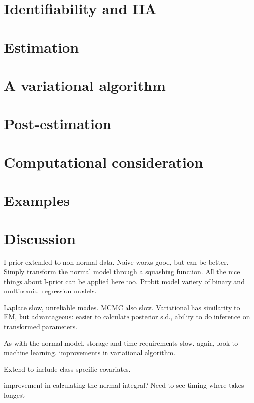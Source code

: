 \documentclass[a4paper,showframe,11pt]{report}
\begin{document}
\section{Identifiability and IIA}\label{sec:iia}
%

\section{Estimation}


\section{A variational algorithm}\label{sec:iprobitvar}


\section{Post-estimation}
%

\section{Computational consideration}
%

\section{Examples}

\section{Discussion}

I-prior extended to non-normal data. 
Naive works good, but can be better.
Simply transform the normal model through a squashing function.
All the nice things about I-prior can be applied here too.
Probit model variety of binary and multinomial regression models.

Laplace slow, unreliable modes. MCMC also slow. Variational has similarity to EM, but advantageous: easier to calculate posterior s.d., ability to do inference on transformed parameters.

As with the normal model, storage and time requirements slow.
again, look to machine learning.
improvements in variational algorithm.

Extend to include class-specific covariates.

improvement in calculating the normal integral?
Need to see timing where takes longest
\end{document}
